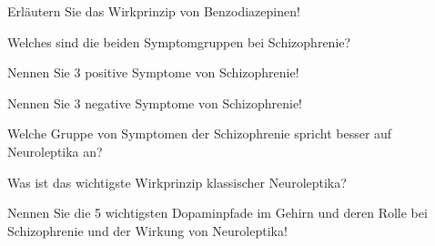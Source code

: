 \documentclass[10pt, a4paper]{exam}
\begin{document}
\begin{questions}
\begin{solution}
  \end{solution}

  \question Erläutern Sie das Wirkprinzip von Benzodiazepinen!
  \begin{solution}

  \end{solution}

  \question Welches sind die beiden Symptomgruppen bei Schizophrenie?
  \begin{solution}

  \end{solution}

  \question Nennen Sie 3 positive Symptome von Schizophrenie!
  \begin{solution}

  \end{solution}

  \question Nennen Sie 3 negative Symptome von Schizophrenie!
  \begin{solution}

  \end{solution}

  \question Welche Gruppe von Symptomen der Schizophrenie spricht besser auf Neuroleptika an?
  \begin{solution}

  \end{solution}

  \question Was ist das wichtigste Wirkprinzip klassischer Neuroleptika?
  \begin{solution}

  \end{solution}

  \question Nennen Sie die 5 wichtigsten Dopaminpfade im Gehirn und deren Rolle bei Schizophrenie und der Wirkung von Neuroleptika!
  \begin{solution}

  \end{solution}
\end{questions}
\end{document}
